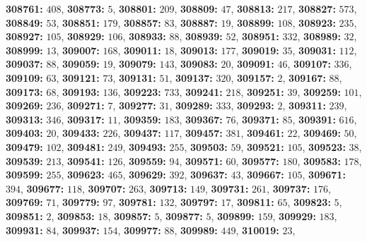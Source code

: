 \textsf{\bfseries 308761:} $408$, \textsf{\bfseries 308773:} $5$, \textsf{\bfseries 308801:} $209$, \textsf{\bfseries 308809:} $47$, \textsf{\bfseries 308813:} $217$, \textsf{\bfseries 308827:} $573$, \textsf{\bfseries 308849:} $53$, \textsf{\bfseries 308851:} $179$, \textsf{\bfseries 308857:} $83$, \textsf{\bfseries 308887:} $19$, \textsf{\bfseries 308899:} $108$, \textsf{\bfseries 308923:} $235$, \textsf{\bfseries 308927:} $105$, \textsf{\bfseries 308929:} $106$, \textsf{\bfseries 308933:} $88$, \textsf{\bfseries 308939:} $52$, \textsf{\bfseries 308951:} $332$, \textsf{\bfseries 308989:} $32$, \textsf{\bfseries 308999:} $13$, \textsf{\bfseries 309007:} $168$, \textsf{\bfseries 309011:} $18$, \textsf{\bfseries 309013:} $177$, \textsf{\bfseries 309019:} $35$, \textsf{\bfseries 309031:} $112$, \textsf{\bfseries 309037:} $88$, \textsf{\bfseries 309059:} $19$, \textsf{\bfseries 309079:} $143$, \textsf{\bfseries 309083:} $20$, \textsf{\bfseries 309091:} $46$, \textsf{\bfseries 309107:} $336$, \textsf{\bfseries 309109:} $63$, \textsf{\bfseries 309121:} $73$, \textsf{\bfseries 309131:} $51$, \textsf{\bfseries 309137:} $320$, \textsf{\bfseries 309157:} $2$, \textsf{\bfseries 309167:} $88$, \textsf{\bfseries 309173:} $68$, \textsf{\bfseries 309193:} $136$, \textsf{\bfseries 309223:} $733$, \textsf{\bfseries 309241:} $218$, \textsf{\bfseries 309251:} $39$, \textsf{\bfseries 309259:} $101$, \textsf{\bfseries 309269:} $236$, \textsf{\bfseries 309271:} $7$, \textsf{\bfseries 309277:} $31$, \textsf{\bfseries 309289:} $333$, \textsf{\bfseries 309293:} $2$, \textsf{\bfseries 309311:} $239$, \textsf{\bfseries 309313:} $346$, \textsf{\bfseries 309317:} $11$, \textsf{\bfseries 309359:} $183$, \textsf{\bfseries 309367:} $76$, \textsf{\bfseries 309371:} $85$, \textsf{\bfseries 309391:} $616$, \textsf{\bfseries 309403:} $20$, \textsf{\bfseries 309433:} $226$, \textsf{\bfseries 309437:} $117$, \textsf{\bfseries 309457:} $381$, \textsf{\bfseries 309461:} $22$, \textsf{\bfseries 309469:} $50$, \textsf{\bfseries 309479:} $102$, \textsf{\bfseries 309481:} $249$, \textsf{\bfseries 309493:} $255$, \textsf{\bfseries 309503:} $59$, \textsf{\bfseries 309521:} $105$, \textsf{\bfseries 309523:} $38$, \textsf{\bfseries 309539:} $213$, \textsf{\bfseries 309541:} $126$, \textsf{\bfseries 309559:} $94$, \textsf{\bfseries 309571:} $60$, \textsf{\bfseries 309577:} $180$, \textsf{\bfseries 309583:} $178$, \textsf{\bfseries 309599:} $255$, \textsf{\bfseries 309623:} $465$, \textsf{\bfseries 309629:} $392$, \textsf{\bfseries 309637:} $43$, \textsf{\bfseries 309667:} $105$, \textsf{\bfseries 309671:} $394$, \textsf{\bfseries 309677:} $118$, \textsf{\bfseries 309707:} $263$, \textsf{\bfseries 309713:} $149$, \textsf{\bfseries 309731:} $261$, \textsf{\bfseries 309737:} $176$, \textsf{\bfseries 309769:} $71$, \textsf{\bfseries 309779:} $97$, \textsf{\bfseries 309781:} $132$, \textsf{\bfseries 309797:} $17$, \textsf{\bfseries 309811:} $65$, \textsf{\bfseries 309823:} $5$, \textsf{\bfseries 309851:} $2$, \textsf{\bfseries 309853:} $18$, \textsf{\bfseries 309857:} $5$, \textsf{\bfseries 309877:} $5$, \textsf{\bfseries 309899:} $159$, \textsf{\bfseries 309929:} $183$, \textsf{\bfseries 309931:} $84$, \textsf{\bfseries 309937:} $154$, \textsf{\bfseries 309977:} $88$, \textsf{\bfseries 309989:} $449$, \textsf{\bfseries 310019:} $23$, 
